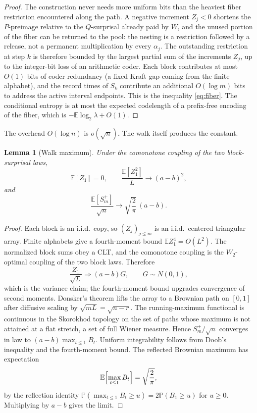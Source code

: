 \documentclass[11pt]{article}
\newtheorem{lemma}[theorem]{Lemma}
\theoremstyle{definition}
\newcommand{\E}{\mathbb{E}}
\newcommand{\Prob}{\mathbb{P}}
\begin{document}
\begin{proof}
The construction never needs more uniform bits than the heaviest fiber restriction encountered along the path.
A negative increment \(Z_j<0\) shortens the \(P\)-preimage relative to the \(Q\)-surprisal already paid by \(W\), and the unused portion of the fiber can be returned to the pool: the nesting is a restriction followed by a release, not a permanent multiplication by every \(\alpha_j\).
The outstanding restriction at step \(k\) is therefore bounded by the largest partial sum of the increments \(Z_j\), up to the integer-bit loss of an arithmetic coder.
Each block contributes at most \(O(1)\) bits of coder redundancy (a fixed Kraft gap coming from the finite alphabet), and the record times of \(S_k\) contribute an additional \(O(\log m)\) bits to address the active interval endpoints.
This is the inequality \eqref{eq:fiber}.
The conditional entropy is at most the expected codelength of a prefix-free encoding of the fiber, which is \(-\E\log_2\lambda+O(1)\).
\end{proof}

The overhead \(O(\log n)\) is \(o(\sqrt{n})\).
The walk itself produces the constant.

\begin{lemma}[Walk maximum]
\label{lem:walk}
Under the comonotone coupling of the two block-surprisal laws,
\[
  \E[Z_1]=0,
  \qquad
  \frac{\E[Z_1^2]}{L}\to(a-b)^2,
\]
and
\[
  \frac{\E[S_m^+]}{\sqrt{n}}
  \to
  \sqrt{\frac{2}{\pi}}\,(a-b).
\]
\end{lemma}

\begin{proof}
Each block is an i.i.d.\ copy, so \((Z_j)_{j\le m}\) is an i.i.d.\ centered triangular array.
Finite alphabets give a fourth-moment bound \(\E Z_1^4=O(L^2)\).
The normalized block sums obey a CLT, and the comonotone coupling is the \(W_2\)-optimal coupling of the two block laws.
Therefore
\[
  \frac{Z_1}{\sqrt{L}}
  \Rightarrow
  (a-b)G,
  \qquad G\sim N(0,1),
\]
which is the variance claim; the fourth-moment bound upgrades convergence of second moments.
Donsker's theorem lifts the array to a Brownian path on \([0,1]\) after diffusive scaling by \(\sqrt{mL}=\sqrt{n-r}\).
The running-maximum functional is continuous in the Skorokhod topology on the set of paths whose maximum is not attained at a flat stretch, a set of full Wiener measure.
Hence \(S_m^+/\sqrt{n}\) converges in law to \((a-b)\max_{t\le 1} B_t\).
Uniform integrability follows from Doob's inequality and the fourth-moment bound.
The reflected Brownian maximum has expectation
\[
  \E\Bigl[\max_{t\le 1} B_t\Bigr]=\sqrt{\frac{2}{\pi}},
\]
by the reflection identity \(\Prob(\max_{t\le 1} B_t\ge u)=2\Prob(B_1\ge u)\) for \(u\ge 0\).
Multiplying by \(a-b\) gives the limit.
\end{proof}
\end{document}
